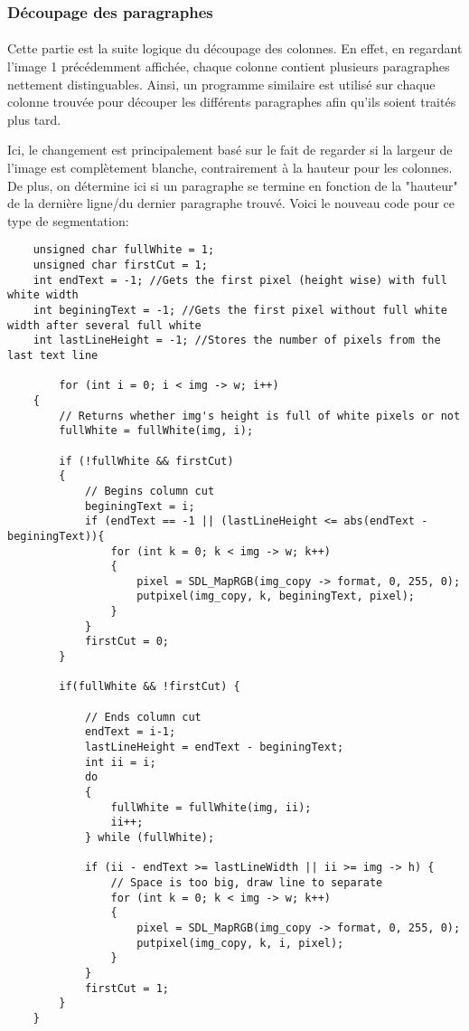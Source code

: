 \documentclass{article}
\begin{document}
	\subsubsection{Découpage des paragraphes}
	\paragraph{}
	Cette partie est la suite logique du découpage des colonnes. En effet, en regardant l'image 1 précédemment affichée, chaque colonne contient plusieurs paragraphes nettement distinguables. Ainsi, un programme similaire est utilisé sur chaque colonne trouvée pour découper les différents paragraphes afin qu'ils soient traités plus tard.
	\par
	Ici, le changement est principalement basé sur le fait de regarder si la largeur de l'image est complètement blanche, contrairement à la hauteur pour les colonnes. De plus, on détermine ici si un paragraphe se termine en fonction de la "hauteur" de la dernière ligne/du dernier paragraphe trouvé. Voici le nouveau code pour ce type de segmentation: \\
	
	\begin{lstlisting}
    unsigned char fullWhite = 1;
    unsigned char firstCut = 1;
    int endText = -1; //Gets the first pixel (height wise) with full white width
    int beginingText = -1; //Gets the first pixel without full white width after several full white 
    int lastLineHeight = -1; //Stores the number of pixels from the last text line
    
		for (int i = 0; i < img -> w; i++) 
    {
        // Returns whether img's height is full of white pixels or not
        fullWhite = fullWhite(img, i);

        if (!fullWhite && firstCut)
        {   
            // Begins column cut
            beginingText = i;
            if (endText == -1 || (lastLineHeight <= abs(endText - beginingText)){
                for (int k = 0; k < img -> w; k++)
                {
                    pixel = SDL_MapRGB(img_copy -> format, 0, 255, 0);
                    putpixel(img_copy, k, beginingText, pixel);
                }   
            }
            firstCut = 0;
        }
        
        if(fullWhite && !firstCut) {
        
            // Ends column cut
            endText = i-1;
            lastLineHeight = endText - beginingText;
            int ii = i;
            do
            {
                fullWhite = fullWhite(img, ii);
                ii++;
            } while (fullWhite);
            
            if (ii - endText >= lastLineWidth || ii >= img -> h) {
                // Space is too big, draw line to separate
                for (int k = 0; k < img -> w; k++)
                {
                    pixel = SDL_MapRGB(img_copy -> format, 0, 255, 0);
                    putpixel(img_copy, k, i, pixel);
                }
            }
            firstCut = 1;
        }
    }	
	\end{lstlisting}
	
\end{document}
